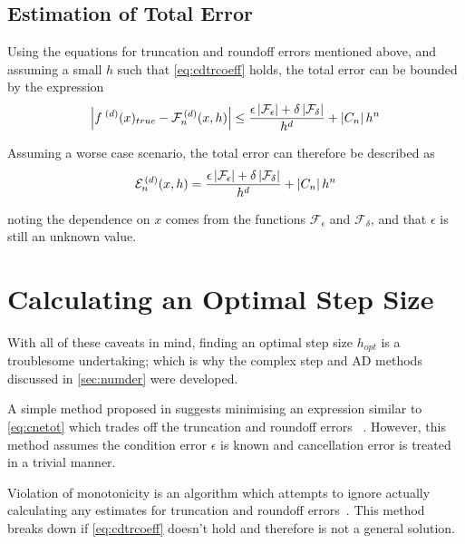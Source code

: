 \subsection{Estimation of Total Error}\label{subsec:cdtoterr}

Using the equations for truncation and roundoff errors mentioned above, and assuming a small $h$ such that \cref{eq:cdtrcoeff} holds, the total error can be bounded by the expression
\begin{equation}
\left\lvert f^{\;(d)}(x)_{true}-\mathcal{F}_n^{\,(d)}(x,h)\right\rvert \leq \frac{\epsilon\left\lvert \mathcal{F}_\epsilon\right\rvert+\delta\left\lvert \mathcal{F}_\delta\right\rvert}{h^d} + \left\lvert C_n\right\rvert h^n
\end{equation}

Assuming a worse case scenario, the total error can therefore be described as
\begin{equation}
\mathcal{E}_n^{\,(d)}(x,h) = \frac{\epsilon\left\lvert \mathcal{F}_\epsilon\right\rvert+\delta\left\lvert \mathcal{F}_\delta\right\rvert}{h^d} + \left\lvert C_n\right\rvert h^n\label{eq:cnetot}
\end{equation}

noting the dependence on $x$ comes from the functions $\mathcal{F}_\epsilon$ and $\mathcal{F}_\delta$, and that $\epsilon$ is still an unknown value.

\section{Calculating an Optimal Step Size}\label{sec:hopt}

With all of these caveats in mind, finding an optimal step size $h_{opt}$ is a troublesome undertaking; which is why the complex step and AD methods discussed in \cref{sec:numder} were developed.

A simple method proposed in \citeauthor{Gill1982} suggests minimising an expression similar to \cref{eq:cnetot} which trades off the truncation and roundoff errors ~\cite{Gill1982,Mathews2004}.
However, this method assumes the condition error $\epsilon$ is known and cancellation error is treated in a trivial manner.

Violation of monotonicity is an algorithm which attempts to ignore actually calculating any estimates for truncation and roundoff errors~\cite{Stepleman1979}. This method breaks down if \cref{eq:cdtrcoeff} doesn't hold and therefore is not a general solution.

